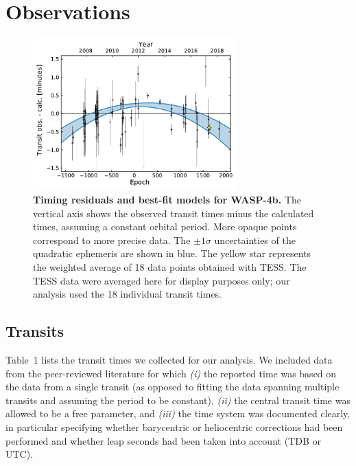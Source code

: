\documentclass[12pt,twocolumn,tighten]{aastex62}
\begin{document}
\section{Observations}
\label{sec:observations}

\begin{figure}[t]
	\begin{center}
		\leavevmode
		\includegraphics[width=0.7\textwidth]{f1.pdf}
	\end{center}
	\vspace{-0.7cm}
	\caption{ {\bf Timing residuals and best-fit models for WASP-4b.}
		The vertical axis shows the observed transit times minus the
		calculated times, assuming a constant orbital period.  More opaque
		points correspond to more precise data.  The $\pm1\sigma$
		uncertainties of the quadratic ephemeris are shown in blue.  The
		yellow star represents the weighted average of 18 data points
		obtained with TESS. The TESS data were averaged here for display
		purposes only; our analysis used the 18 individual transit times.
		\label{fig:times}
	}
\end{figure}


\subsection{Transits}

Table~1 lists the transit times we collected for our analysis.  We
included data from the peer-reviewed literature for which {\it (i)}
the reported time was based on the data from a single transit (as
opposed to fitting the data spanning multiple transits and assuming
the period to be constant), {\it (ii)} the central transit time was
allowed to be a free parameter, and {\it (iii)} the time system was
documented clearly, in particular specifying whether barycentric or
heliocentric corrections had been performed and whether leap seconds
had been taken into account (TDB or UTC).
\end{document}
